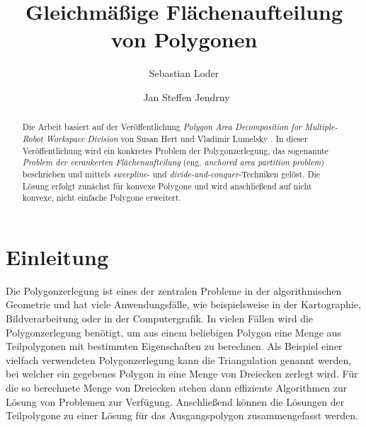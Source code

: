 \documentclass[ngerman]{seminarbeitrag}
\begin{document}
\title{Gleichmäßige Flächenaufteilung von Polygonen}
\author{Sebastian Loder\and\ Jan Steffen Jendrny}

\maketitle%

\begin{abstract}
Die Arbeit basiert auf der Veröffentlichung \emph{Polygon Area Decomposition for Multiple-Robot Workspace Division} von Susan Hert und Vladimir Lumelsky \cite{Hert.1998}.
In dieser Veröffentlichung wird ein konkretes Problem der Polygonzerlegung, das sogenannte \emph{Problem der verankerten Flächenaufteilung} (eng. \emph{anchored
area partition problem}) beschrieben und mittels \emph{sweepline}- und \emph{divide-and-conquer}-Techniken gelöst. Die Lösung erfolgt zunächst für konvexe Polygone und wird anschließend auf nicht konvexe, nicht einfache Polygone erweitert.

\end{abstract}

\section{Einleitung}\label{einleitung}
Die Polygonzerlegung ist eines der zentralen Probleme in der algorithmischen Geometrie und hat viele Anwendungsfälle, wie beispielsweise in der Kartographie,
Bildverarbeitung oder in der Computergrafik. In vielen Fällen wird die Polygonzerlegung benötigt, um aus einem beliebigen Polygon eine Menge aus Teilpolygonen mit bestimmten
Eigenschaften zu berechnen. Als Beispiel einer vielfach verwendeten Polygonzerlegung kann die Triangulation genannt werden, bei welcher ein gegebenes Polygon in eine Menge von Dreiecken
zerlegt wird. Für die so berechnete Menge von Dreiecken stehen dann effiziente Algorithmen zur Lösung von Problemen zur Verfügung. Anschließend können die Lösungen der Teilpolygone zu
einer Lösung für das Ausgangspolygon zusammengefasst werden. \\
\end{document}
